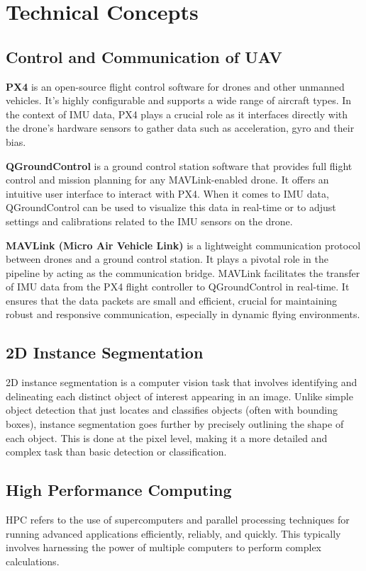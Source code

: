 \chapter{Technical Concepts}

\section{Control and Communication of UAV}
\textbf{PX4} is an open-source flight control software for drones and other unmanned vehicles. It's highly configurable and supports a wide range of aircraft types. In the context of IMU data, PX4 plays a crucial role as it interfaces directly with the drone's hardware sensors to gather data such as acceleration, gyro and their bias.

\textbf{QGroundControl} is a ground control station software that provides full flight control and mission planning for any MAVLink-enabled drone. It offers an intuitive user interface to interact with PX4. When it comes to IMU data, QGroundControl can be used to visualize this data in real-time or to adjust settings and calibrations related to the IMU sensors on the drone.

\textbf{MAVLink (Micro Air Vehicle Link)} is a lightweight communication protocol between drones and a ground control station. It plays a pivotal role in the pipeline by acting as the communication bridge. MAVLink facilitates the transfer of IMU data from the PX4 flight controller to QGroundControl in real-time. It ensures that the data packets are small and efficient, crucial for maintaining robust and responsive communication, especially in dynamic flying environments.


\section{2D Instance Segmentation}
2D instance segmentation is a computer vision task that involves identifying and delineating each distinct object of interest appearing in an image. Unlike simple object detection that just locates and classifies objects (often with bounding boxes), instance segmentation goes further by precisely outlining the shape of each object. This is done at the pixel level, making it a more detailed and complex task than basic detection or classification.
\section{High Performance Computing}
HPC refers to the use of supercomputers and parallel processing techniques for running advanced applications efficiently, reliably, and quickly. This typically involves harnessing the power of multiple computers to perform complex calculations.

